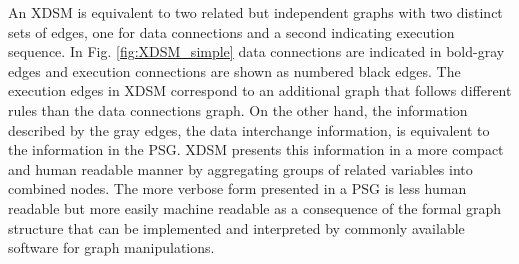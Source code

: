 An XDSM is equivalent to two related but independent graphs with two distinct sets of edges, one for data 
connections and a second indicating execution sequence. In Fig. \ref{fig:XDSM_simple}
data connections are indicated in bold-gray edges and execution connections are shown as numbered black edges. The
execution edges in XDSM correspond to an additional graph that
follows different rules than the data connections graph. 
On the other hand, the information described by the gray edges, 
the data interchange information, is equivalent to the information in the PSG. XDSM presents this 
information in a more compact and human readable manner by aggregating groups of related variables
into combined nodes. The more verbose form presented in a PSG is less human readable but more easily 
machine readable as a consequence of the formal graph structure that can be implemented and interpreted by commonly available software for graph manipulations. 



